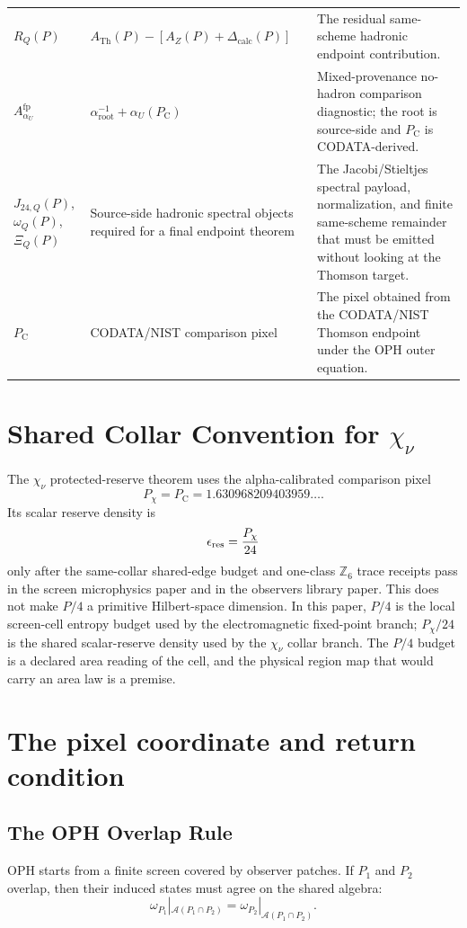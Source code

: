 \documentclass[11pt]{article}
\theoremstyle{remark}
\newcommand{\A}{\mathcal A}
\newcommand{\ATh}{A_{\mathrm{Th}}}
\newcommand{\AZ}{A_Z}
\newcommand{\Ppub}{P_{\mathrm C}}
\newcommand{\Rq}{R_Q}
\newcommand{\Dcalc}{\Delta_{\mathrm{calc}}}
\begin{document}
\begin{longtable}{@{}L{0.20\textwidth}L{0.32\textwidth}L{0.38\textwidth}@{}}
\(\Rq(P)\) & \(\ATh(P)-[\AZ(P)+\Dcalc(P)]\) & The residual same-scheme hadronic endpoint contribution. \\
\(A_{\alpha_U}^{\mathrm{fp}}\) & \(\alpha_{\mathrm{root}}^{-1}+\alpha_U(\Ppub)\) & Mixed-provenance no-hadron comparison diagnostic; the root is source-side and \(\Ppub\) is CODATA-derived. \\
\(J_{24,Q}(P)\), \(\omega_Q(P)\), \(\Xi_Q(P)\) & Source-side hadronic spectral objects required for a final endpoint theorem & The Jacobi/Stieltjes spectral payload, normalization, and finite same-scheme remainder that must be emitted without looking at the Thomson target. \\
\(\Ppub\) & CODATA/NIST comparison pixel & The pixel obtained from the CODATA/NIST Thomson endpoint under the OPH outer equation. \\
\bottomrule
\end{longtable}

\section{Shared Collar Convention for \(\chi_\nu\)}

The \(\chi_\nu\) protected-reserve theorem uses the alpha-calibrated comparison
pixel
\[
P_\chi=P_{\mathrm C}=1.630968209403959\ldots .
\]
Its scalar reserve density is
\[
\epsilon_{\rm res}=\frac{P_\chi}{24}
\]
only after the same-collar shared-edge budget and one-class \(\mathbb Z_6\)
trace receipts pass in the screen microphysics paper and in the observers library paper.  This
does not make \(P/4\) a primitive Hilbert-space dimension.  In this paper,
\(P/4\) is the local screen-cell entropy budget used by the electromagnetic
fixed-point branch; \(P_\chi/24\) is the shared scalar-reserve density used by the
\(\chi_\nu\) collar branch. The \(P/4\) budget is a declared area reading of the cell,
and the physical region map that would carry an area law is a premise.

\section{The pixel coordinate and return condition}
\subsection{The OPH Overlap Rule}
\label{sec:alpha-step-1}

OPH starts from a finite screen covered by observer patches. If \(P_1\) and \(P_2\) overlap, then their induced states must agree on the shared algebra:
\begin{equation}
\omega_{P_1}|_{\A(P_1\cap P_2)}
=
\omega_{P_2}|_{\A(P_1\cap P_2)}.
\label{eq:overlap}
\end{equation}
\end{document}
